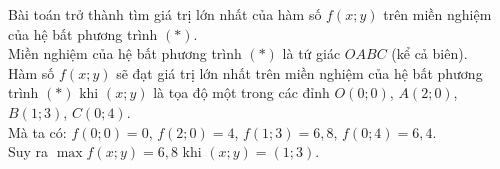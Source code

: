 \begin{bt}
{{}
		Bài toán trở thành tìm giá trị lớn nhất của hàm số $f(x;y)$ trên miền nghiệm của hệ bất phương trình $(*)$.\\
		Miền nghiệm của hệ bất phương trình $(*)$ là tứ giác $OABC$ (kể cả biên).\\
		Hàm số $f(x;y)$ sẽ đạt giá trị lớn nhất trên miền nghiệm của hệ bất phương trình $(*)$ khi $(x;y)$ là tọa độ một trong các đỉnh $O(0;0)$, $A(2;0)$, $B(1;3)$, $C(0;4)$. \\
		Mà ta có: $f(0;0)=0$, $f(2;0)=4$, $f(1;3)=6{,}8$, $f(0;4)=6{,}4$.\\
		Suy ra $\max f(x;y)=6{,}8$ khi $(x;y)=(1;3)$.
	}
\end{bt}

